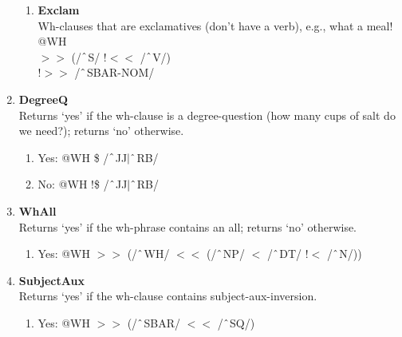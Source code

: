 \begin{enumerate}
\begin{enumerate}
            \item \textbf{Exclam} \\
            Wh-clauses that are exclamatives (don't have a verb), e.g., \textsf{what a meal!}
            @WH\\ 
            $>\!\!>$ (/$\string^$S/ !$<\!\!<$ /$\string^$V/) \\
            !$>\!\!>$ /$\string^$SBAR-NOM/
        \end{enumerate}
    \item \textbf{DegreeQ}\\
    Returns `yes' if the wh-clause is a degree-question (\textsf{how many cups of salt do we need?}); returns `no' otherwise.
        \begin{enumerate}
            \item Yes: @WH \$ /$\string^$JJ$|\string^$RB/
            \item No: @WH !\$ /$\string^$JJ$|\string^$RB/
        \end{enumerate}
    \item \textbf{WhAll}\\
    Returns `yes' if the wh-phrase contains an \textsf{all}; returns `no' otherwise.
        \begin{enumerate}
            \item Yes: @WH $>\!\!>$ (/$\string^$WH/ $<\!\!<$ (/$\string^$NP/ $<$ /$\string^$DT/ !$<$ /$\string^$N/))
        \end{enumerate}
    \item \textbf{SubjectAux}\\
    Returns `yes' if the wh-clause contains subject-aux-inversion.
        \begin{enumerate}
            \item Yes: @WH $>\!\!>$ (/$\string^$SBAR/ $<\!\!<$ /$\string^$SQ/)
        \end{enumerate}
    
\end{enumerate}

